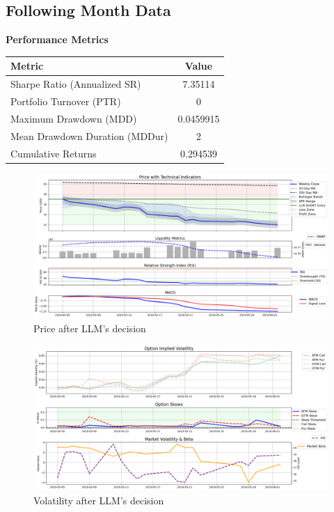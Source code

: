 \documentclass[8pt]{scrartcl}
\begin{document}
\subsection*{Following Month Data}

\textbf{Performance Metrics}

\begin{longtable}{l c}
\toprule
\textbf{Metric} & \textbf{Value} \\
\midrule
Sharpe Ratio (Annualized SR) & 7.35114 \\
Portfolio Turnover (PTR) & 0 \\
Maximum Drawdown (MDD) & 0.0459915 \\
Mean Drawdown Duration (MDDur) & 2 \\
Cumulative Returns & 0.294539 \\
\bottomrule
\end{longtable}

\begin{figure}[H]
    \centering
    \includegraphics[width=1\linewidth]{judge_reviews//TSLA_M_gpt-4o-mini/2019-05-05/llm_Price_with_Technical_Indicators.png}
    \caption{Price after LLM's decision}
\end{figure}

\begin{figure}[H]
    \centering
    \includegraphics[width=1\linewidth]{judge_reviews/TSLA_M_gpt-4o-mini/2019-05-05/llm_Market_Volatility_&_Beta.png}
    \caption{Volatility after LLM's decision}
\end{figure}
\end{document}
